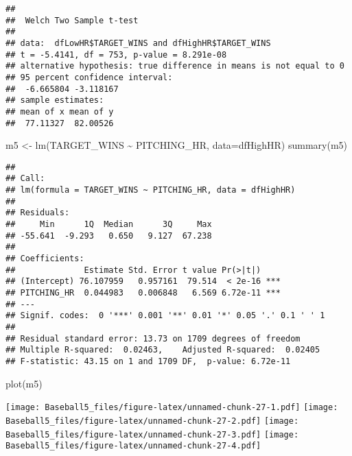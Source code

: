 \documentclass[
]{article}
\newenvironment{Shaded}{\begin{snugshade}}{\end{snugshade}}
\newcommand{\AttributeTok}[1]{\textcolor[rgb]{0.77,0.63,0.00}{#1}}
\newcommand{\DecValTok}[1]{\textcolor[rgb]{0.00,0.00,0.81}{#1}}
\newcommand{\FunctionTok}[1]{\textcolor[rgb]{0.00,0.00,0.00}{#1}}
\newcommand{\NormalTok}[1]{#1}
\newcommand{\OtherTok}[1]{\textcolor[rgb]{0.56,0.35,0.01}{#1}}
\newcommand{\SpecialCharTok}[1]{\textcolor[rgb]{0.00,0.00,0.00}{#1}}
\begin{document}
\begin{verbatim}
## 
##  Welch Two Sample t-test
## 
## data:  dfLowHR$TARGET_WINS and dfHighHR$TARGET_WINS
## t = -5.4141, df = 753, p-value = 8.291e-08
## alternative hypothesis: true difference in means is not equal to 0
## 95 percent confidence interval:
##  -6.665804 -3.118167
## sample estimates:
## mean of x mean of y 
##  77.11327  82.00526
\end{verbatim}

\begin{Shaded}
\begin{Highlighting}[]
\NormalTok{m5 }\OtherTok{\textless{}{-}} \FunctionTok{lm}\NormalTok{(TARGET\_WINS }\SpecialCharTok{\textasciitilde{}}\NormalTok{ PITCHING\_HR, }\AttributeTok{data=}\NormalTok{dfHighHR)}
\FunctionTok{summary}\NormalTok{(m5)}
\end{Highlighting}
\end{Shaded}

\begin{verbatim}
## 
## Call:
## lm(formula = TARGET_WINS ~ PITCHING_HR, data = dfHighHR)
## 
## Residuals:
##     Min      1Q  Median      3Q     Max 
## -55.641  -9.293   0.650   9.127  67.238 
## 
## Coefficients:
##              Estimate Std. Error t value Pr(>|t|)    
## (Intercept) 76.107959   0.957161  79.514  < 2e-16 ***
## PITCHING_HR  0.044983   0.006848   6.569 6.72e-11 ***
## ---
## Signif. codes:  0 '***' 0.001 '**' 0.01 '*' 0.05 '.' 0.1 ' ' 1
## 
## Residual standard error: 13.73 on 1709 degrees of freedom
## Multiple R-squared:  0.02463,    Adjusted R-squared:  0.02405 
## F-statistic: 43.15 on 1 and 1709 DF,  p-value: 6.72e-11
\end{verbatim}

\begin{Shaded}
\begin{Highlighting}[]
\FunctionTok{plot}\NormalTok{(m5)}
\end{Highlighting}
\end{Shaded}

\texttt{[image: Baseball5\_files/figure-latex/unnamed-chunk-27-1.pdf]}
\texttt{[image: Baseball5\_files/figure-latex/unnamed-chunk-27-2.pdf]}
\texttt{[image: Baseball5\_files/figure-latex/unnamed-chunk-27-3.pdf]}
\texttt{[image: Baseball5\_files/figure-latex/unnamed-chunk-27-4.pdf]}

\begin{Shaded}
\end{Shaded}
\end{document}
